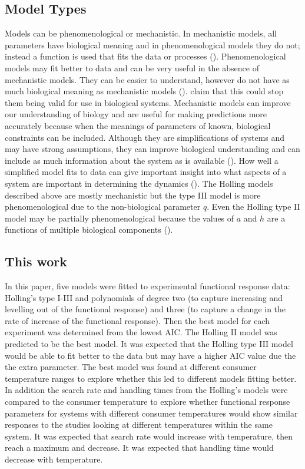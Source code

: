 \documentclass{article}
\begin{document}
\subsection{Model Types}
Models can be phenomenological or mechanistic. In mechanistic models, all parameters have biological meaning and in phenomenological models they do not; instead a function is used that fits the data or processes (\cite{Otto2007AEvolution,Geritz2012MathematicalModels}). Phenomenological models may fit better to data and can be very useful in the absence of mechanistic models. They can be easier to understand, however do not have as much biological meaning as mechanistic models (\cite{Otto2007AEvolution}). \cite{Geritz2012MathematicalModels} claim that this could stop them being valid for use in biological systems.  
Mechanistic models can improve our understanding of biology and are useful for making predictions more accurately because when the meanings of parameters of known, biological constraints can be included. Although they are simplifications of systems and may have strong assumptions, they can improve biological understanding and can include as much information about the system as is available (\cite{Otto2007AEvolution,Kendall1999WhyApproaches}). How well a simplified model fits to data can give important insight into what aspects of a system are important in determining the dynamics (\cite{Geritz2012MathematicalModels}).
The Holling models described above are mostly mechanistic but the type III model is more phenomenological due to the non-biological parameter $q$. Even the Holling type II model may be partially phenomenological because the values of $a$ and $h$ are a functions of  multiple biological components (\cite{Hassel1976TheDeath-Rate}).
\subsection{This work}
In this paper, five models were fitted to experimental functional response data: Holling's type I-III and polynomials of degree two (to capture increasing and levelling out of the functional response) and three (to capture a change in the rate of increase of the functional response). Then the best model for each experiment was determined from the lowest AIC. The Holling II model was predicted to be the best model. It was expected that the Holling type III model would be able to fit better to the data but may have a higher AIC value due the the extra parameter.  The best model was found at different consumer temperature ranges to explore whether this led to different models fitting better. In addition the search rate and handling times from the Holling's models were compared to the consumer temperature to explore whether functional response parameters for systems with different consumer temperatures would show similar responses to the studies looking at different temperatures within the same system. It was expected that search rate would increase with temperature, then reach a maximum and decrease. It was expected that handling time would decrease with temperature.
\end{document}
